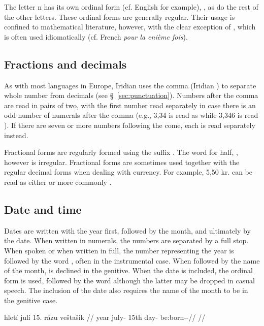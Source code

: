 The letter n has its own ordinal form (cf. English  for example), , as do the rest of the other letters. These ordinal forms are generally regular. Their usage is confined to mathematical literature, however, with the clear exception of , which is often used idiomatically (cf. French \textit{pour la eni\`eme fois}).

\subsection{Fractions and decimals}

As with most languages in Europe, Iridian uses the comma (Iridian ) to separate whole number from decimals (see \S~\ref{sec:punctuation}). Numbers after the comma are read in pairs of two, with the first number read separately in case there is an odd number of numerals after the comma (e.g., 3,34 is read as  while 3,346 is read ). If there are seven or more numbers following the come, each is read separately instead.

Fractional forms are regularly formed using the suffix . The word for half, , however is irregular. Fractional forms are sometimes used together with the regular decimal forms when dealing with currency. For example, 5,50 kr. can be read as either  or more commonly .

\subsection{Date and time}
Dates are written with the year first, followed by the month, and ultimately by the date. When written in numerals, the numbers are separated by a full stop. When spoken or when written in full, the number representing the year is followed by the word , often in the instrumental case. When followed by the name of the month,  is declined in the genitive. When the date is included, the ordinal form is used, followed by the word  although the latter may be dropped in casual speech. The inclusion of the date also requires the name of the month to be in the genitive case.

\pex
\a
\begingl
     hletí julí 15. rázu veštašik //
     year july-\Gen{} 15th day-\Ins{} be:born-\Av{}-\Pf{}//
    \glft {}//
\endgl
\xe

